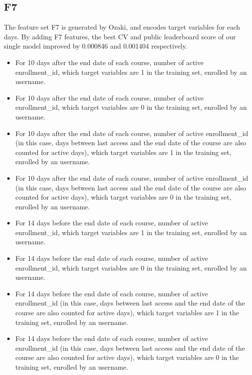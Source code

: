 \subsection{F7}

The feature set F7 is generated by Ozaki, and encodes target variables for each days.  By adding F7 features, the best CV and public leaderboard score of our single model improved by 0.000846 and 0.001404 respectively. 

\begin{itemize}
  \setlength\itemsep{0em}
  \item For 10 days after the end date of each course, number of active enrollment\_id, which target variables are 1 in the training set, enrolled by an username.
  \item For 10 days after the end date of each course, number of active enrollment\_id, which target variables are 0 in the training set, enrolled by an username.
  \item For 10 days after the end date of each course, number of active enrollment\_id (in this case, days between last access and the end date of the course are also counted for active days), which target variables are 1 in the training set, enrolled by an username.
  \item For 10 days after the end date of each course, number of active enrollment\_id (in this case, days between last access and the end date of the course are also counted for active days), which target variables are 0 in the training set, enrolled by an username.
  \item For 14 days before the end date of each course, number of active enrollment\_id, which target variables are 1 in the training set, enrolled by an username.
  \item For 14 days before the end date of each course, number of active enrollment\_id, which target variables are 0 in the training set, enrolled by an username.
  \item For 14 days before the end date of each course, number of active enrollment\_id (in this case, days between last access and the end date of the course are also counted for active days), which target variables are 1 in the training set, enrolled by an username.
  \item For 14 days before the end date of each course, number of active enrollment\_id (in this case, days between last access and the end date of the course are also counted for active days), which target variables are 0 in the training set, enrolled by an username.
\end{itemize}

